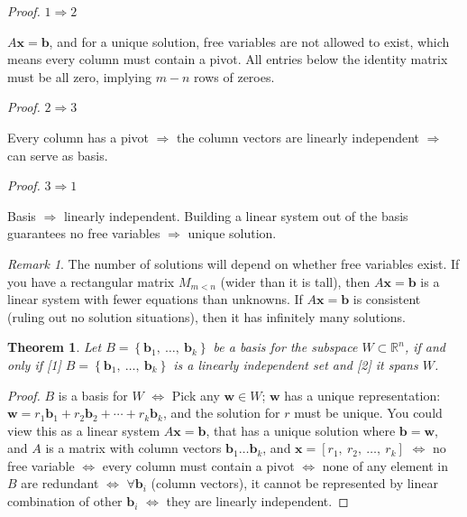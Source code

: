 \documentclass[12pt]{article}
\theoremstyle{plain}
\newtheorem{theorem}{Theorem}[section]
\theoremstyle{remark}
\newtheorem{remark}{Remark}
\theoremstyle{definition}
\begin{document}
\begin{proof} \(1 \Rightarrow 2\)

\(A\mathbf{x} = \mathbf{b}\), and for a unique solution, free
variables are not allowed to exist, which means every column must
contain a pivot. All entries below the identity matrix must be all zero,
implying \(m - n\) rows of zeroes.

\emph{Proof.} \(2 \Rightarrow 3\)

Every column has a pivot \(\Rightarrow\) the column vectors are linearly
independent \(\Rightarrow\) can serve as basis.

\emph{Proof.} \(3 \Rightarrow 1\)

Basis \(\Rightarrow\) linearly independent. Building a linear system out
of the basis guarantees no free variables \(\Rightarrow\) unique
solution.

\begin{remark}
The number of solutions will depend on whether free
variables exist. If you have a rectangular matrix \(M_{m < n}\) (wider
than it is tall), then \(A\mathbf{x} = \mathbf{b}\) is a linear
system with fewer equations than unknowns. If
\(A\mathbf{x} = \mathbf{b}\) is consistent (ruling out no
solution situations), then it has infinitely many solutions.
\end{remark}

\begin{theorem}
Let
\(B = \left\{ {\mathbf{b}}_{1},\ \ldots,\ {\mathbf{b}}_{k} \right\}\)
be a basis for the subspace \(W \subset \mathbb{R}^{n}\), if and only if
{[}1{]}
\(B = \left\{ {\mathbf{b}}_{1},\ \ldots,\ {\mathbf{b}}_{k} \right\}\)
is a linearly independent set and {[}2{]} it spans \(W\).
\end{theorem}

\emph{Proof.} \(B\) is a basis for \(W\) \(\Leftrightarrow\) Pick any
\(\mathbf{w} \in W\); \(\mathbf{w}\) has a unique
representation:
\(\mathbf{w} = r_{1}{\mathbf{b}}_{1} + r_{2}{\mathbf{b}}_{2} + \cdots + r_{k}{\mathbf{b}}_{k}\),
and the solution for \(r\) must be unique. You could view this as a
linear system \(A\mathbf{x} = \mathbf{b}\), that has a unique
solution where \(\mathbf{b} = \mathbf{w}\), and \(A\) is a
matrix with column vectors
\({\mathbf{b}}_{1}\ldots{\mathbf{b}}_{k}\), and
\(\mathbf{x} = \left\lbrack r_{1},\ r_{2},\ \ldots,\ r_{k} \right\rbrack\)
\(\Leftrightarrow\) no free variable \(\Leftrightarrow\) every column
must contain a pivot \(\Leftrightarrow\) none of any element in \(B\)
are redundant \(\Leftrightarrow\) \(\forall{\mathbf{b}}_{i}\)
(column vectors), it cannot be represented by linear combination of
other \({\mathbf{b}}_{i}\) \(\Leftrightarrow\) they are linearly
independent.



\end{proof}
\end{document}
